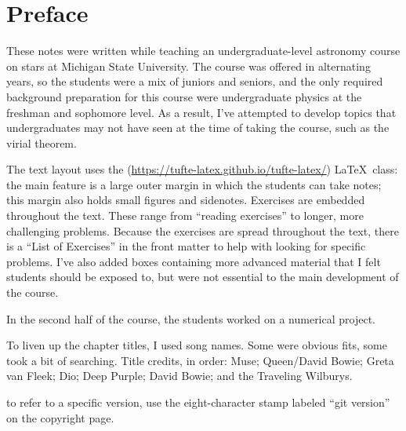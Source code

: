 
\section*{Preface}
These notes were written while teaching an undergraduate-level astronomy course on stars at Michigan State University. The course was offered in alternating years, so the students were a mix of juniors and seniors, and the only required background preparation for this course were undergraduate physics at the freshman and sophomore level. As a result, I've attempted to develop topics that undergraduates may not have seen at the time of taking the course, such as the virial theorem.

The text layout uses the  (\url{https://tufte-latex.github.io/tufte-latex/}) \LaTeX\ class:  the main feature is a large outer margin in which the students can take notes; this margin also holds small figures and sidenotes. Exercises are embedded throughout the text.  These range from ``reading exercises'' to longer, more challenging problems.  Because the exercises are spread throughout the text, there is a ``List of Exercises'' in the front matter to help with looking for specific problems. I've also added boxes containing more advanced material that I felt students should be exposed to, but were not essential to the main development of the course.

In the second half of the course, the students worked on a numerical project.

To liven up the chapter titles, I used song names. Some were obvious fits, some took a bit of searching. Title credits, in order: Muse; Queen/David Bowie; Greta van Fleek; Dio; Deep Purple; David Bowie; and the Traveling Wilburys.

 to refer to a specific version, use the eight-character stamp labeled ``git version'' on the copyright page.
